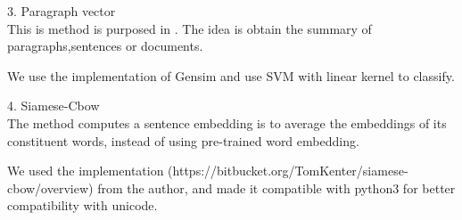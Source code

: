 3. Paragraph vector \cite{PVDB}\\

	This is method is purposed in \cite{PVDB}. The idea is obtain the summary of paragraphs,sentences or documents.

We use the implementation of Gensim and use SVM with linear kernel to classify.

4. Siamese-Cbow\cite{kenter2016siamesecbow}\\

	The method computes a sentence embedding is to average the embeddings of its
constituent words, instead of using pre-trained word embedding.

	We used the implementation (https://bitbucket.org/TomKenter/siamese-cbow/overview) from the author, and made it compatible with python3 for better compatibility with unicode.
